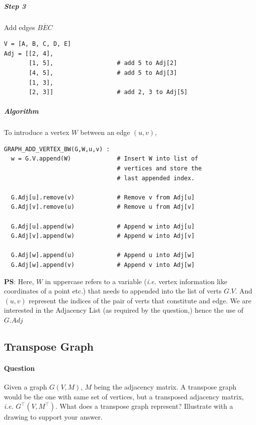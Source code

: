 \documentclass[11pt]{article}
\begin{document}
\subparagraph*{Step 3}
\label{sec:org50e54e7}
Add edges \(\overline{\mathit{BEC}}\)
\begin{verbatim}
V = [A, B, C, D, E]
Adj = [[2, 4],
       [1, 5],                  # add 5 to Adj[2]
       [4, 5],                  # add 5 to Adj[3]
       [1, 3],
       [2, 3]]                  # add 2, 3 to Adj[5]
\end{verbatim}

\subparagraph*{Algorithm}
\label{sec:org205e505}

To introduce a vertex \(W\) between an edge \((u,v)\),

\begin{verbatim}
GRAPH_ADD_VERTEX_BW(G,W,u,v) :
  w = G.V.append(W)             # Insert W into list of
                                # vertices and store the
                                # last appended index.

  G.Adj[u].remove(v)            # Remove v from Adj[u]
  G.Adj[v].remove(u)            # Remove u from Adj[v]

  G.Adj[u].append(w)            # Append w into Adj[u]
  G.Adj[v].append(w)            # Append w into Adj[v]

  G.Adj[w].append(u)            # Append u into Adj[w]
  G.Adj[w].append(v)            # Append v into Adj[w]
\end{verbatim}

\textbf{PS}: Here, \(W\) in uppercase refers to a variable
(\emph{i.e.} vertex information like coordinates of a point
etc.) that needs to appended into the list of verts
\(G.V\). And \((u,v)\) represent the indices of the pair of
verts that constitute and edge.  We are interested in
the Adjacency List (as required by the question,) hence
the use of \(G.Adj\)

\subsection{Transpose Graph}
\label{sec:transpose-graph}
\paragraph*{Question}
\label{sec:org5637b57}
Given a graph \(G(V,M)\), \(M\) being the adjacency matrix.
A transpose graph would be the one with same set of
vertices, but a transposed adjacency matrix, \emph{i.e.}
\(G^{\top}(V,M^{\top})\).  What does a transpose graph
represent?  Illustrate with a drawing to support your
answer.
\end{document}
